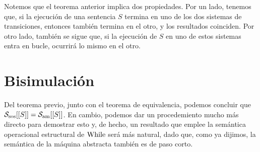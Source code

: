 Notemos que el teorema anterior implica dos propiedades. Por un lado, tenemos que, si la ejecución de una sentencia $S$ termina en uno de los dos sistemas de transiciones, entonces también termina en el otro, y los resultados coinciden. Por otro lado, también se sigue que, si la ejecución de $S$ en uno de estos sistemas entra en bucle, ocurrirá lo mismo en el otro.

\section{Bisimulación}

Del teorema previo, junto con el teorema de equivalencia, podemos concluir que $\mathcal{S}_{\mathrm{sos}}[[S]] = \mathcal{S}_{\mathrm{am}}[[S]]$. En cambio, podemos dar un procedemiento mucho más directo para demostrar esto y, de hecho, un resultado que emplee la semántica operacional estructural de $\mathrm{While}$ será más natural, dado que, como ya dijimos, la semántica de la máquina abstracta también es de paso corto.
\\

